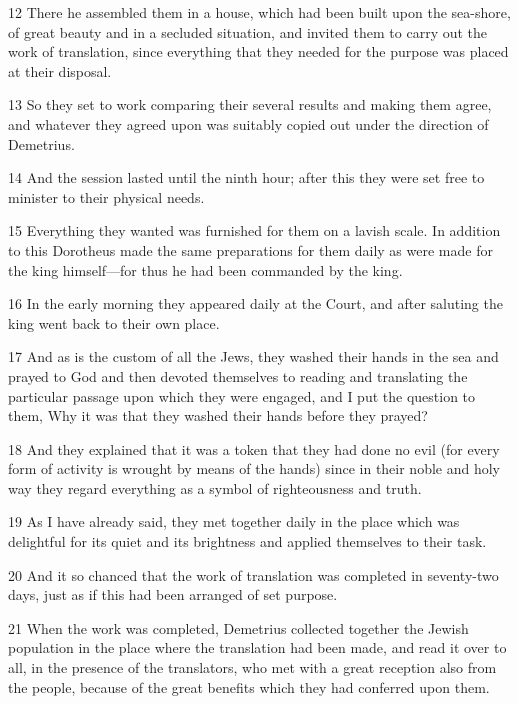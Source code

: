 \par 12 There he assembled them in a house, which had been built upon the sea-shore, of great beauty and in a secluded situation, and invited them to carry out the work of translation, since everything that they needed for the purpose was placed at their disposal.

\par 13 So they set to work comparing their several results and making them agree, and whatever they agreed upon was suitably copied out under the direction of Demetrius.

\par 14 And the session lasted until the ninth hour; after this they were set free to minister to their physical needs.

\par 15 Everything they wanted was furnished for them on a lavish scale. In addition to this Dorotheus made the same preparations for them daily as were made for the king himself—for thus he had been commanded by the king.

\par 16 In the early morning they appeared daily at the Court, and after saluting the king went back to their own place.

\par 17 And as is the custom of all the Jews, they washed their hands in the sea and prayed to God and then devoted themselves to reading and translating the particular passage upon which they were engaged, and I put the question to them, Why it was that they washed their hands before they prayed?

\par 18 And they explained that it was a token that they had done no evil (for every form of activity is wrought by means of the hands) since in their noble and holy way they regard everything as a symbol of righteousness and truth.

\par 19 As I have already said, they met together daily in the place which was delightful for its quiet and its brightness and applied themselves to their task.

\par 20 And it so chanced that the work of translation was completed in seventy-two days, just as if this had been arranged of set purpose.

\par 21 When the work was completed, Demetrius collected together the Jewish population in the place where the translation had been made, and read it over to all, in the presence of the translators, who met with a great reception also from the people, because of the great benefits which they had conferred upon them.

